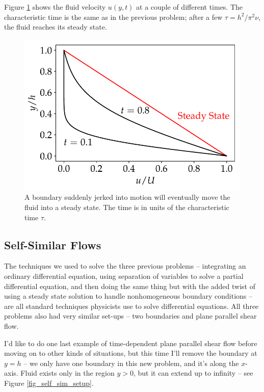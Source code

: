 Figure \ref{fig_poise_imp} shows the fluid velocity $u(y,t)$ at a couple of different times.  The characteristic time is the same as in the previous problem; after a few $\tau = h^2/\pi^2 \nu$, the fluid reaches its steady state.


\begin{figure}
\centering
\includegraphics[width=0.7\linewidth]{Figures/Chapter2/fig_poise_imp}
\caption{A boundary suddenly jerked into motion will eventually move the fluid into a steady state.  The time is in units of the characteristic time $\tau$.}
\label{fig_poise_imp}
\end{figure}




\subsection{Self-Similar Flows}
\label{sec_self_similar}

The techniques we used to solve the three previous problems -- integrating an ordinary differential equation, using separation of variables to solve a partial differential equation, and then doing the same thing but with the added twist of using a steady state solution to handle nonhomogeneous boundary conditions -- are all standard techniques physicists use to solve differential equations.  All three problems also had very similar set-ups -- two boundaries and plane parallel shear flow.

I'd like to do one last example of time-dependent plane parallel shear flow before moving on to other kinds of situations, but this time I'll remove the boundary at $y=h$ -- we only have one boundary in this new problem, and it's along the $x$-axis.  Fluid exists only in the region $y>0$, but it can extend up to infinity -- see Figure \ref{fig_self_sim_setup}.

